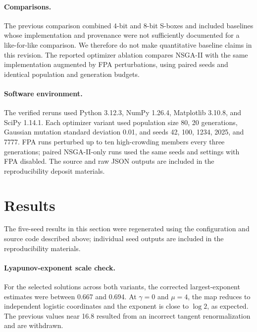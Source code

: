 \documentclass[11pt,a4paper]{article}
\begin{document}
\paragraph{Comparisons.}
The previous comparison combined 4-bit and 8-bit S-boxes and included
baselines whose implementation and provenance were not sufficiently
documented for a like-for-like comparison. We therefore do not make
quantitative baseline claims in this revision. The reported optimizer
ablation compares NSGA-II with the same implementation augmented by
FPA perturbations, using paired seeds and identical population and
generation budgets.

\paragraph{Software environment.}
The verified reruns used Python 3.12.3, NumPy 1.26.4,
Matplotlib 3.10.8, and SciPy 1.14.1. Each optimizer variant used
population size 80, 20 generations, Gaussian mutation standard
deviation 0.01, and seeds 42, 100, 1234, 2025, and 7777. FPA runs
perturbed up to ten high-crowding members every three generations;
paired NSGA-II-only runs used the same seeds and settings with FPA
disabled. The source and raw JSON outputs are included in the
reproducibility deposit materials.

\section{Results}
\label{sec:results}

The five-seed results in this section were regenerated using the
configuration and source code described above; individual seed outputs
are included in the reproducibility materials.

\paragraph{Lyapunov-exponent scale check.}
For the selected solutions across both variants, the corrected
largest-exponent estimates were between 0.667 and 0.694. At
$\gamma=0$ and $\mu=4$, the map reduces to independent logistic
coordinates and the exponent is close to $\log 2$, as expected.
The previous values near 16.8 resulted from an incorrect tangent
renormalization and are withdrawn.
\end{document}
